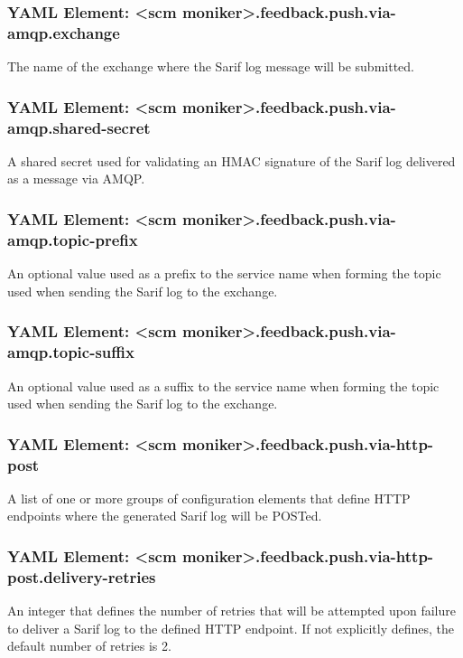 \subsubsection{YAML Element: <scm moniker>.feedback.push.via-amqp.exchange}\label{sec:yaml-push-via-amqp-exchange}
The name of the exchange where the Sarif log message will be submitted.

\subsubsection{YAML Element: <scm moniker>.feedback.push.via-amqp.shared-secret}\label{sec:yaml-push-via-amqp-shared-secret}
A shared secret used for validating an HMAC signature of the Sarif log delivered as a message via AMQP.

\subsubsection{YAML Element: <scm moniker>.feedback.push.via-amqp.topic-prefix}\label{sec:yaml-push-via-amqp-topic-prefix}
An optional value used as a prefix to the service name when forming the topic used when sending the Sarif log to the exchange.

\subsubsection{YAML Element: <scm moniker>.feedback.push.via-amqp.topic-suffix}\label{sec:yaml-push-via-amqp-topic-suffix}
An optional value used as a suffix to the service name when forming the topic used when sending the Sarif log to the exchange.

\subsubsection{YAML Element: <scm moniker>.feedback.push.via-http-post}\label{sec:yaml-push-via-http-post}
A list of one or more groups of configuration elements that define HTTP endpoints where the generated Sarif log will be POSTed.

\subsubsection{YAML Element: <scm moniker>.feedback.push.via-http-post.delivery-retries}\label{sec:yaml-push-via-http-post-delivery-retries}
An integer that defines the number of retries that will be attempted upon failure to deliver a Sarif log to the defined HTTP endpoint.  If not
explicitly defines, the default number of retries is 2.

